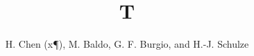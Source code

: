 \documentclass[aps,prc]{revtex4}
\begin{document}
\title{T}
\author{H. Chen (x\P), M. Baldo, G. F. Burgio, and H.-J. Schulze}
\maketitle
\end{document}
